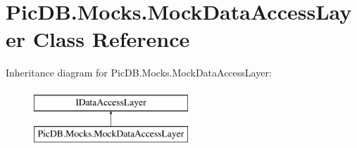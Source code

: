 \hypertarget{class_pic_d_b_1_1_mocks_1_1_mock_data_access_layer}{}\section{Pic\+D\+B.\+Mocks.\+Mock\+Data\+Access\+Layer Class Reference}
\label{class_pic_d_b_1_1_mocks_1_1_mock_data_access_layer}
Inheritance diagram for Pic\+D\+B.\+Mocks.\+Mock\+Data\+Access\+Layer\+:\begin{figure}[H]
\begin{center}
\leavevmode
\includegraphics[height=2.000000cm]{class_pic_d_b_1_1_mocks_1_1_mock_data_access_layer}
\end{center}
\end{figure}
